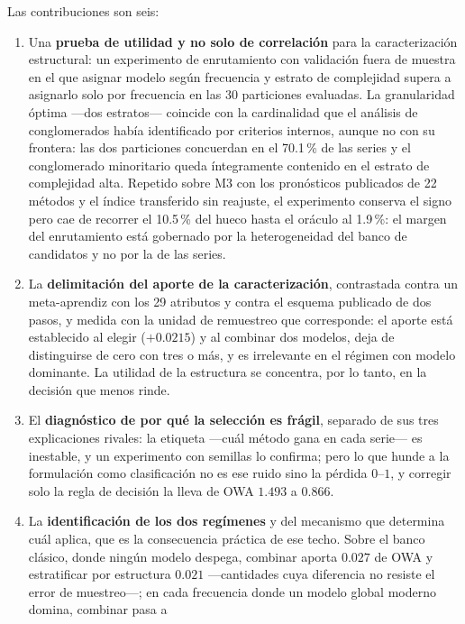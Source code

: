 Las contribuciones son seis:

\begin{enumerate}
\item Una \textbf{prueba de utilidad y no solo de correlación} para la caracterización
      estructural: un experimento de enrutamiento con validación fuera de muestra en el
      que asignar modelo según frecuencia y estrato de complejidad supera a asignarlo
      solo por frecuencia en las 30 particiones evaluadas. La granularidad óptima ---dos
      estratos--- coincide con la cardinalidad que el análisis de conglomerados había
      identificado por criterios internos, aunque no con su frontera: las dos particiones
      concuerdan en el 70.1\,\% de las series y el conglomerado minoritario queda
      íntegramente contenido en el estrato de complejidad alta. Repetido sobre M3 con los
      pronósticos publicados de 22 métodos y el índice transferido sin reajuste, el
      experimento conserva el signo pero cae de recorrer el 10.5\,\% del hueco hasta el
      oráculo al 1.9\,\%: el margen del enrutamiento está gobernado por la heterogeneidad
      del banco de candidatos y no por la de las series.
\item La \textbf{delimitación del aporte de la caracterización}, contrastada contra un
      meta-aprendiz con los 29 atributos y contra el esquema publicado de dos pasos, y
      medida con la unidad de remuestreo que corresponde: el aporte está establecido al
      elegir ($+0.0215$) y al combinar dos modelos, deja de distinguirse de cero con tres
      o más, y es irrelevante en el régimen con modelo dominante. La utilidad de la
      estructura se concentra, por lo tanto, en la decisión que menos rinde.
\item El \textbf{diagnóstico de por qué la selección es frágil}, separado de sus tres
      explicaciones rivales: la etiqueta ---cuál método gana en cada serie--- es
      inestable, y un experimento con semillas lo confirma; pero lo que hunde a la
      formulación como clasificación no es ese ruido sino la pérdida $0$--$1$, y corregir
      solo la regla de decisión la lleva de OWA $1.493$ a $0.866$.
\item La \textbf{identificación de los dos regímenes} y del mecanismo que determina cuál
      aplica, que es la consecuencia práctica de ese techo. Sobre el banco clásico, donde
      ningún modelo despega, combinar aporta $0.027$ de OWA y estratificar por estructura
      $0.021$ ---cantidades cuya diferencia no resiste el error de muestreo---; en cada
      frecuencia donde un modelo global moderno domina, combinar pasa a

\end{enumerate}

